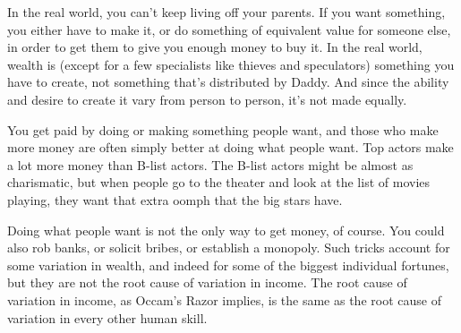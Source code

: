 In the real world, you can't keep living off your parents. If you want
something, you either have to make it, or do something of equivalent
value for someone else, in order to get them to give you enough money to
buy it. In the real world, wealth is (except for a few specialists like
thieves and speculators) something you have to create, not something
that's distributed by Daddy. And since the ability and desire to create
it vary from person to person, it's not made equally.

You get paid by doing or making something people want, and those who
make more money are often simply better at doing what people want. Top
actors make a lot more money than B-list actors. The B-list actors might
be almost as charismatic, but when people go to the theater and look at
the list of movies playing, they want that extra oomph that the big
stars have.

Doing what people want is not the only way to get money, of course. You
could also rob banks, or solicit bribes, or establish a monopoly. Such
tricks account for some variation in wealth, and indeed for some of the
biggest individual fortunes, but they are not the root cause of
variation in income. The root cause of variation in income, as Occam's
Razor implies, is the same as the root cause of variation in every other
human skill.

